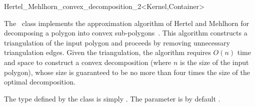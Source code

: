 
\ccRefPageBegin

\begin{ccRefClass}{Hertel_Mehlhorn_convex_decomposition_2<Kernel,Container>}
\label{mink_ref:HM_decomp}


\ccDefinition

The \ccRefName\ class implements the approximation algorithm of Hertel
and Mehlhorn for decomposing a polygon into convex 
sub-polygons~\cite{hm-ftsp-83}. This algorithm constructs a
triangulation of the input polygon and proceeds by removing
unnecessary triangulation edges. Given the triangulation, the
algorithm requires $O(n)$ time and space to construct a convex
decomposition (where $n$ is the size of the input polygon), whose
size is guaranteed to be no more than four times the size of the
optimal decomposition.

The  type defined by the class is simply
. The  parameter
is by default .


\ccIsModel

\ccSeeAlso
{}

\end{ccRefClass}

\ccRefPageEnd
